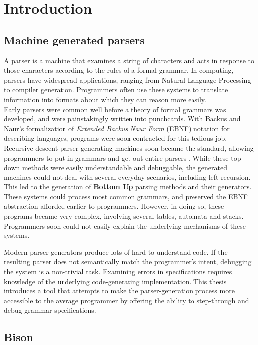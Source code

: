 \chapter{Introduction}

\section{Machine generated parsers}

A parser is a machine that examines a string of characters and acts in response to those characters according to the rules of a formal grammar. In computing, parsers have widespread applications, ranging from Natural Language Processing to compiler generation. Programmers often use these systems to translate information into formats about which they can reason more easily.\\

Early parsers were common well before a theory of formal grammars was developed, and were painstakingly written into punchcards. With Backus and Naur's formalization of \emph{Extended Backus Naur Form} (EBNF) notation for describing languages, programs were soon contracted for this tedious job. Recursive-descent parser generating machines soon became the standard, allowing programmers to put in grammars and get out entire parsers \cite{Bidwell}. While these top-down methods were easily understandable and debuggable, the generated machines could not deal with several everyday scenarios, including left-recursion. This led to the generation of \textbf{Bottom Up} parsing methods and their generators. These systems could process most common grammars, and preserved the EBNF abstraction afforded earlier to programmers. However, in doing so, these programs became very complex, involving several tables, automata and stacks. Programmers soon could not easily explain the underlying mechanisms of these systems.

Modern parser-generators produce lots of hard-to-understand code. If the resulting parser does not semantically match the programmer's intent, debugging the system is a non-trivial task. Examining errors in specifications requires knowledge of the underlying code-generating implementation. This thesis introduces a tool that attempts to make the parser-generation process more accessible to the average programmer by offering the ability to step-through and debug grammar specifications.


\section{Bison}

